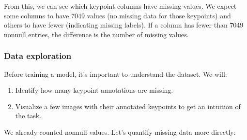 \documentclass[letterpaper,10pt,english]{jupyterBook}
\begin{document}
\sphinxAtStartPar
From this, we can see which keypoint columns have missing values. We expect some columns to have 7049 values (no missing data for those keypoints) and others to have fewer (indicating missing labels). If a column has fewer than 7049 non\sphinxhyphen{}null entries, the difference is the number of missing values.


\subsubsection{Data exploration}
\label{\detokenize{04:data-exploration}}
\sphinxAtStartPar
Before training a model, it’s important to understand the dataset. We will:
\begin{enumerate}
%
\item {} 
\sphinxAtStartPar
Identify how many keypoint annotations are missing.

\item {} 
\sphinxAtStartPar
Visualize a few images with their annotated keypoints to get an intuition of the task.

\end{enumerate}

\sphinxAtStartPar
{}

\sphinxAtStartPar
We already counted non\sphinxhyphen{}null values. Let’s quantify missing data more directly:
\end{document}
